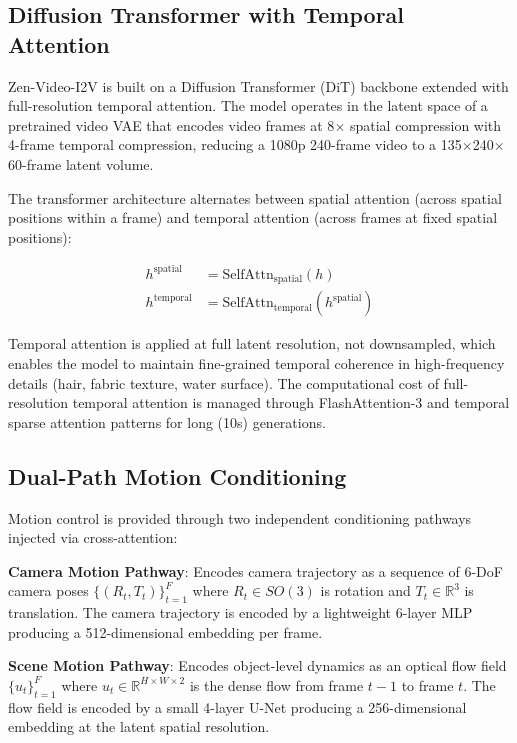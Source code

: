 \documentclass[11pt,a4paper]{article}
\begin{document}
\subsection{Diffusion Transformer with Temporal Attention}

Zen-Video-I2V is built on a Diffusion Transformer (DiT) \cite{dit} backbone extended with full-resolution temporal attention. The model operates in the latent space of a pretrained video VAE \cite{vae} that encodes video frames at 8$\times$ spatial compression with 4-frame temporal compression, reducing a 1080p 240-frame video to a 135$\times$240$\times$60-frame latent volume.

The transformer architecture alternates between spatial attention (across spatial positions within a frame) and temporal attention (across frames at fixed spatial positions):

\begin{align}
  h^{\text{spatial}} &= \text{SelfAttn}_{\text{spatial}}(h) \\
  h^{\text{temporal}} &= \text{SelfAttn}_{\text{temporal}}(h^{\text{spatial}})
\end{align}

Temporal attention is applied at full latent resolution, not downsampled, which enables the model to maintain fine-grained temporal coherence in high-frequency details (hair, fabric texture, water surface). The computational cost of full-resolution temporal attention is managed through FlashAttention-3 \cite{flashattn3} and temporal sparse attention patterns for long (10s) generations.

\subsection{Dual-Path Motion Conditioning}

Motion control is provided through two independent conditioning pathways injected via cross-attention:

\textbf{Camera Motion Pathway}: Encodes camera trajectory as a sequence of 6-DoF camera poses $\{(R_t, T_t)\}_{t=1}^F$ where $R_t \in SO(3)$ is rotation and $T_t \in \mathbb{R}^3$ is translation. The camera trajectory is encoded by a lightweight 6-layer MLP producing a 512-dimensional embedding per frame.

\textbf{Scene Motion Pathway}: Encodes object-level dynamics as an optical flow field $\{u_t\}_{t=1}^F$ where $u_t \in \mathbb{R}^{H \times W \times 2}$ is the dense flow from frame $t-1$ to frame $t$. The flow field is encoded by a small 4-layer U-Net producing a 256-dimensional embedding at the latent spatial resolution.
\end{document}
